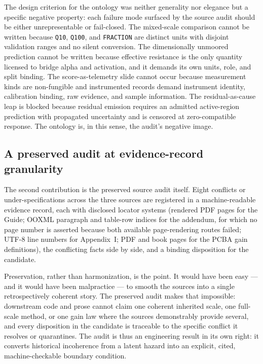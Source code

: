 The design criterion for the ontology was neither generality nor elegance but a specific negative property: each failure mode surfaced by the source audit should be either unrepresentable or fail-closed. The mixed-scale comparison cannot be written because \texttt{Q10}, \texttt{Q100}, and \texttt{FRACTION} are distinct units with disjoint validation ranges and no silent conversion. The dimensionally unmoored prediction cannot be written because effective resistance is the only quantity licensed to bridge alpha and activation, and it demands its own units, role, and split binding. The score-as-telemetry slide cannot occur because measurement kinds are non-fungible and instrumented records demand instrument identity, calibration binding, raw evidence, and sample information. The residual-as-cause leap is blocked because residual emission requires an admitted active-region prediction with propagated uncertainty and is censored at zero-compatible response. The ontology is, in this sense, the audit's negative image.

\subsection{A preserved audit at evidence-record granularity}\label{ch01:contrib:audit}

The second contribution is the preserved source audit itself. Eight conflicts or under-specifications across the three sources are registered in a machine-readable evidence record, each with disclosed locator systems (rendered PDF pages for the Guide; OOXML paragraph and table-row indices for the addendum, for which no page number is asserted because both available page-rendering routes failed; UTF-8 line numbers for Appendix~I; PDF and book pages for the PCBA gain definitions), the conflicting facts side by side, and a binding disposition for the candidate.

Preservation, rather than harmonization, is the point. It would have been easy --- and it would have been malpractice --- to smooth the sources into a single retrospectively coherent story. The preserved audit makes that impossible: downstream code and prose cannot claim one coherent inherited scale, one full-scale method, or one gain law where the sources demonstrably provide several, and every disposition in the candidate is traceable to the specific conflict it resolves or quarantines. The audit is thus an engineering result in its own right: it converts historical incoherence from a latent hazard into an explicit, cited, machine-checkable boundary condition.

